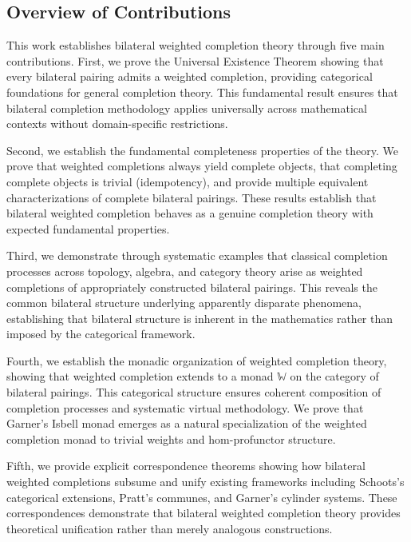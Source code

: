 \documentclass[11pt]{article}
\theoremstyle{plain}
\theoremstyle{definition}
\theoremstyle{remark}
\begin{document}
\subsection{Overview of Contributions}

This work establishes bilateral weighted completion theory through five main contributions. First, we prove the Universal Existence Theorem showing that every bilateral pairing admits a weighted completion, providing categorical foundations for general completion theory. This fundamental result ensures that bilateral completion methodology applies universally across mathematical contexts without domain-specific restrictions.

Second, we establish the fundamental completeness properties of the theory. We prove that weighted completions always yield complete objects, that completing complete objects is trivial (idempotency), and provide multiple equivalent characterizations of complete bilateral pairings. These results establish that bilateral weighted completion behaves as a genuine completion theory with expected fundamental properties.

Third, we demonstrate through systematic examples that classical completion processes across topology, algebra, and category theory arise as weighted completions of appropriately constructed bilateral pairings. This reveals the common bilateral structure underlying apparently disparate phenomena, establishing that bilateral structure is inherent in the mathematics rather than imposed by the categorical framework.

Fourth, we establish the monadic organization of weighted completion theory, showing that weighted completion extends to a monad $\mathbb{W}$ on the category of bilateral pairings. This categorical structure ensures coherent composition of completion processes and systematic virtual methodology. We prove that Garner's Isbell monad emerges as a natural specialization of the weighted completion monad to trivial weights and hom-profunctor structure.

Fifth, we provide explicit correspondence theorems showing how bilateral weighted completions subsume and unify existing frameworks including Schoots's categorical extensions, Pratt's communes, and Garner's cylinder systems. These correspondences demonstrate that bilateral weighted completion theory provides theoretical unification rather than merely analogous constructions.
\end{document}
